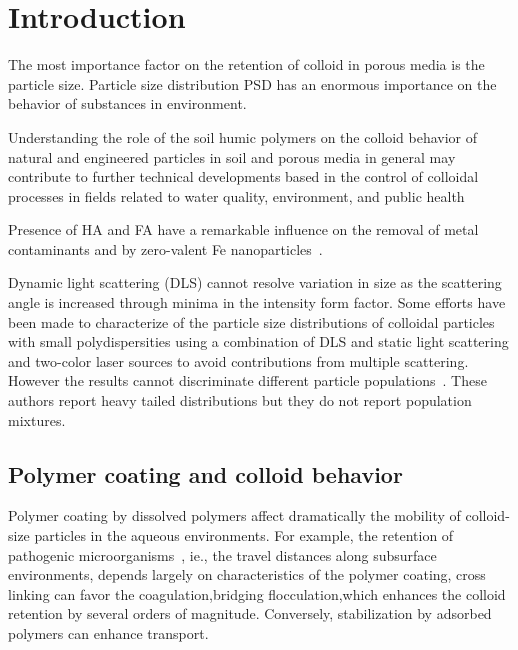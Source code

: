 \documentclass[journal=langd5,manuscript=article]{achemso}
\begin{document}
\section{Introduction}


The most importance factor on the retention of colloid in porous media is the
particle size. Particle size distribution PSD has an enormous importance on the
behavior of substances in environment.

Understanding  the role of the soil humic polymers on the colloid behavior of
natural and engineered particles in soil and porous media in general  may contribute to further technical developments based in the control of colloidal processes in fields related to 
water quality, environment, and public health~\cite{Ngo2008}
\cite{Farre2011}

Presence of HA and FA have a remarkable influence on the removal of metal contaminants 
and
by zero-valent Fe nanoparticles~\cite{Mak2011234}.




Dynamic light scattering (DLS)  cannot resolve variation in size as the scattering angle is increased through minima in the intensity form factor.
Some efforts have been made to characterize of the particle size distributions of colloidal particles with small polydispersities using a combination of DLS and static light scattering and two-color laser sources to avoid contributions from multiple scattering. However the results cannot discriminate different particle populations~\cite{Bryant2003AccurateSuspensions}. These authors report heavy tailed distributions but they do not report population mixtures.




\subsection{Polymer coating and colloid behavior}

Polymer coating by dissolved polymers affect dramatically the mobility of colloid-size particles in the aqueous environments.
For example, the retention of pathogenic microorganisms~\cite{Morales2011a}, ie., the travel distances along  subsurface environments, depends largely on characteristics of the polymer coating, cross linking can favor the coagulation,bridging flocculation,which enhances the colloid retention by several orders of magnitude. Conversely,  stabilization by adsorbed polymers can enhance transport.
\end{document}
